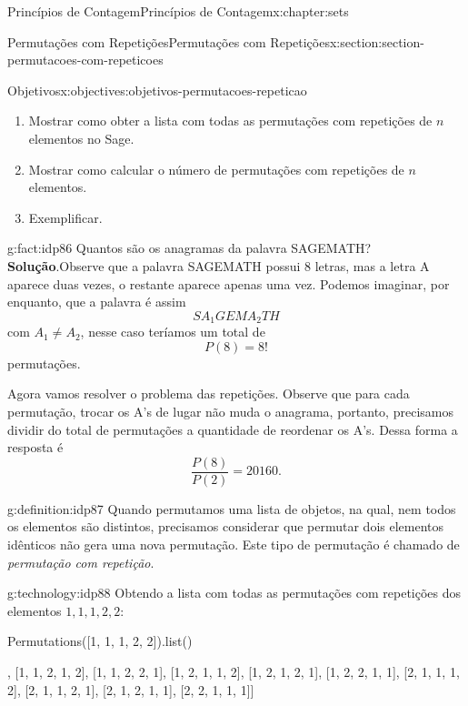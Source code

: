 \documentclass[oneside,10pt,]{book}
\newcommand{\blocktitlefont}{\relax}
\numberwithin{equation}{section}
\begin{document}
\begin{chapterptx}{Princípios de Contagem}{}{Princípios de Contagem}{}{}{x:chapter:sets}
\begin{sectionptx}{Permutações com Repetições}{}{Permutações com Repetições}{}{}{x:section:section-permutacoes-com-repeticoes}
\begin{objectives}{Objetivos}{x:objectives:objetivos-permutacoes-repeticao}
\begin{enumerate}
\item{}Mostrar como obter a lista com todas as permutações com repetições de \(n\) elementos no Sage.%
\item{}Mostrar como calcular o número de permutações com repetições de \(n\) elementos.%
\item{}Exemplificar.%
\end{enumerate}
\end{objectives}
\begin{fact}{}{}{g:fact:idp86}%
Quantos são os anagramas da palavra SAGEMATH?%
\textbf{\blocktitlefont Solução}.\quad{}Observe que a palavra SAGEMATH possui 8 letras, mas a letra A aparece duas vezes, o restante aparece apenas uma vez. Podemos imaginar, por enquanto, que a palavra é assim%
\begin{equation*}
SA_1GEMA_2TH
\end{equation*}
com \(A_1\neq A_2\), nesse caso teríamos um total de%
\begin{equation*}
P(8) = 8! 
\end{equation*}
permutações.%
\par
Agora vamos resolver o problema das repetições. Observe que para cada permutação, trocar os A's de lugar não muda o anagrama, portanto, precisamos dividir do total de permutações a quantidade de reordenar os A's. Dessa forma a resposta é%
\begin{equation*}
\frac{P(8)}{P(2)}=20160.
\end{equation*}
%
\end{fact}
\begin{definition}{}{g:definition:idp87}%
Quando permutamos uma lista de objetos, na qual, nem todos os elementos são distintos, precisamos considerar que permutar dois elementos idênticos não gera uma nova permutação. Este tipo de permutação é chamado de \emph{permutação com repetição}.%
\end{definition}
\begin{technology}{}{g:technology:idp88}%
Obtendo a lista com todas as permutações com repetições dos elementos \(1, 1, 1, 2, 2\): \begin{sageinput}
Permutations([1, 1, 1, 2, 2]).list()
\end{sageinput}
\begin{sageoutput}
[[1, 1, 1, 2, 2],
 [1, 1, 2, 1, 2],
 [1, 1, 2, 2, 1],
 [1, 2, 1, 1, 2],
 [1, 2, 1, 2, 1],
 [1, 2, 2, 1, 1],
 [2, 1, 1, 1, 2],
 [2, 1, 1, 2, 1],
 [2, 1, 2, 1, 1],
 [2, 2, 1, 1, 1]]
\end{sageoutput}
\end{technology}

\end{sectionptx}
\end{chapterptx}
\end{document}
